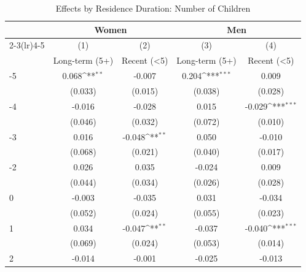 \begin{table}[htbp]\centering
\def\sym#1{\ifmmode^{#1}\else\(^{#1}\)\fi}
\caption{Effects by Residence Duration: Number of Children}
\begin{tabular}{l*{4}{c}}
\hline\hline
            &\multicolumn{2}{c}{Women}                  &\multicolumn{2}{c}{Men}                    \\\cmidrule(lr){2-3}\cmidrule(lr){4-5}
            &\multicolumn{1}{c}{(1)}&\multicolumn{1}{c}{(2)}&\multicolumn{1}{c}{(3)}&\multicolumn{1}{c}{(4)}\\
            &\multicolumn{1}{c}{Long-term (5+)}&\multicolumn{1}{c}{Recent (<5)}&\multicolumn{1}{c}{Long-term (5+)}&\multicolumn{1}{c}{Recent (<5)}\\
\hline
-5          &       0.068\sym{**} &      -0.007         &       0.204\sym{***}&       0.009         \\
            &     (0.033)         &     (0.015)         &     (0.038)         &     (0.028)         \\
[1em]
-4          &      -0.016         &      -0.028         &       0.015         &      -0.029\sym{***}\\
            &     (0.046)         &     (0.032)         &     (0.072)         &     (0.010)         \\
[1em]
-3          &       0.016         &      -0.048\sym{**} &       0.050         &      -0.010         \\
            &     (0.068)         &     (0.021)         &     (0.040)         &     (0.017)         \\
[1em]
-2          &       0.026         &       0.035         &      -0.024         &       0.009         \\
            &     (0.044)         &     (0.034)         &     (0.026)         &     (0.028)         \\
[1em]
0           &      -0.003         &      -0.035         &       0.031         &      -0.034         \\
            &     (0.052)         &     (0.024)         &     (0.055)         &     (0.023)         \\
[1em]
1           &       0.034         &      -0.047\sym{**} &      -0.037         &      -0.040\sym{***}\\
            &     (0.069)         &     (0.024)         &     (0.053)         &     (0.014)         \\
[1em]
2           &      -0.014         &      -0.001         &      -0.025         &      -0.013         \\

\end{tabular}
\end{table}
